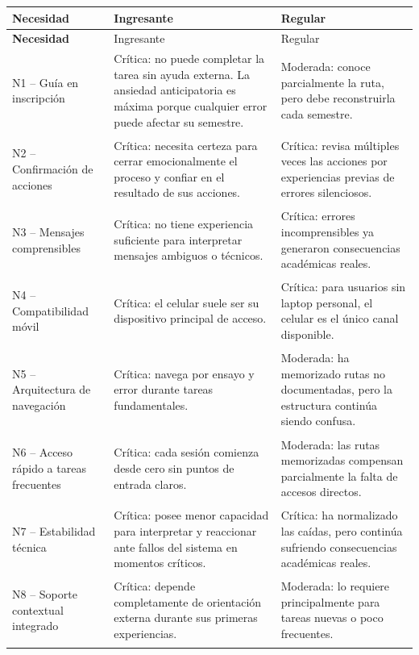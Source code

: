 {\small
\setlength{\tabcolsep}{4pt}
\renewcommand{\arraystretch}{1.2}
\begin{longtable}{|>{\bfseries}p{3.1cm}|p{5.35cm}|p{5.35cm}|}
\hline
Necesidad & Ingresante & Regular \\
\hline
\endfirsthead

\hline
Necesidad & Ingresante & Regular \\
\hline
\endhead

N1 -- Guía en inscripción & Crítica: no puede completar la tarea sin ayuda externa. La ansiedad anticipatoria es máxima porque cualquier error puede afectar su semestre. & Moderada: conoce parcialmente la ruta, pero debe reconstruirla cada semestre. \\
\hline

N2 -- Confirmación de acciones & Crítica: necesita certeza para cerrar emocionalmente el proceso y confiar en el resultado de sus acciones. & Crítica: revisa múltiples veces las acciones por experiencias previas de errores silenciosos. \\
\hline

N3 -- Mensajes comprensibles & Crítica: no tiene experiencia suficiente para interpretar mensajes ambiguos o técnicos. & Crítica: errores incomprensibles ya generaron consecuencias académicas reales. \\
\hline

N4 -- Compatibilidad móvil & Crítica: el celular suele ser su dispositivo principal de acceso. & Crítica: para usuarios sin laptop personal, el celular es el único canal disponible. \\
\hline

N5 -- Arquitectura de navegación & Crítica: navega por ensayo y error durante tareas fundamentales. & Moderada: ha memorizado rutas no documentadas, pero la estructura continúa siendo confusa. \\
\hline

N6 -- Acceso rápido a tareas frecuentes & Crítica: cada sesión comienza desde cero sin puntos de entrada claros. & Moderada: las rutas memorizadas compensan parcialmente la falta de accesos directos. \\
\hline

N7 -- Estabilidad técnica & Crítica: posee menor capacidad para interpretar y reaccionar ante fallos del sistema en momentos críticos. & Crítica: ha normalizado las caídas, pero continúa sufriendo consecuencias académicas reales. \\
\hline

N8 -- Soporte contextual integrado & Crítica: depende completamente de orientación externa durante sus primeras experiencias. & Moderada: lo requiere principalmente para tareas nuevas o poco frecuentes. \\
\hline


\end{longtable}}
